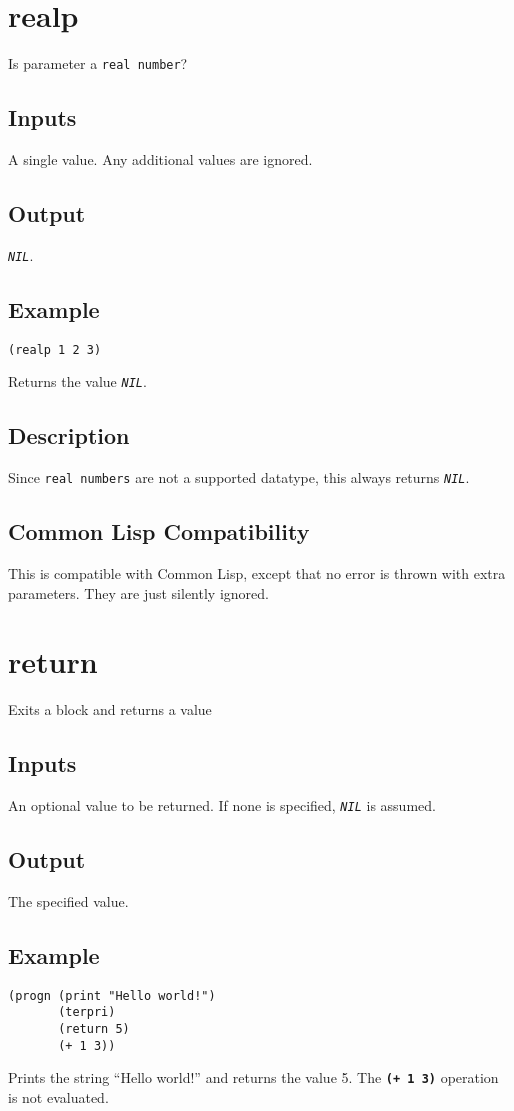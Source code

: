 \documentclass[10pt, openany]{book}
\newcommand{\operation}[1]{\textbf{\texttt{#1}}}
\newcommand{\constant}[1]{\emph{\texttt{#1}}}
\newcommand{\datatype}[1]{\texttt{#1}}
\newcommand{\cl}{Common Lisp}
\begin{document}
\section{realp}
Is parameter a \datatype{real number}?
\subsection{Inputs}
A single value.  Any additional values are ignored.
\subsection{Output}
\constant{NIL}.
\subsection{Example}
\begin{lstlisting}
(realp 1 2 3)
\end{lstlisting}
Returns the value \constant{NIL}.
\subsection{Description}
Since \datatype{real numbers} are not a supported datatype, this always returns \constant{NIL}.
\subsection{Common Lisp Compatibility}
This is compatible with \cl, except that no error is thrown with extra parameters.  They are just silently ignored.

\section{return}
Exits a block and returns a value
\subsection{Inputs}
An optional value to be returned.  If none is specified, \constant{NIL} is assumed.
\subsection{Output}
The specified value.
\subsection{Example}
\begin{lstlisting}
(progn (print "Hello world!")
       (terpri)
       (return 5)
       (+ 1 3))
\end{lstlisting}
Prints the string ``Hello world!'' and returns the value 5.  The \operation{(+ 1 3)} operation is not evaluated.
\end{document}
